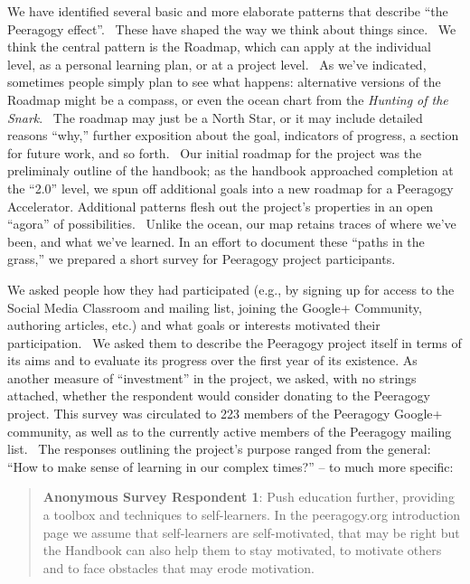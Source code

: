 We have identified several basic and more elaborate patterns that
describe ``the Peeragogy effect''.~ These have shaped the way we think
about things since.~ We think the central pattern is the Roadmap, which
can apply at the individual level, as a personal learning plan, or at a
project level.~ As we've indicated, sometimes people simply plan to see
what happens: alternative versions of the Roadmap might be a compass, or
even the ocean chart from the \emph{Hunting of the Snark}.~ The roadmap
may just be a North Star, or it may include detailed reasons ``why,''
further exposition about the goal, indicators of progress, a section for
future work, and so forth.~ Our initial roadmap for the project was the
preliminaly outline of the handbook; as the handbook approached
completion at the ``2.0'' level, we spun off additional goals into a new
roadmap for a Peeragogy Accelerator. Additional patterns flesh out the
project's properties in an open ``agora'' of possibilities.~ Unlike the
ocean, our map retains traces of where we've been, and what we've
learned. In an effort to document these ``paths in the grass,'' we
prepared a short survey for Peeragogy project participants.

We asked people how they had participated (e.g., by signing up for
access to the Social Media Classroom and mailing list, joining the
Google+ Community, authoring articles, etc.) and what goals or interests
motivated their participation.~ We asked them to describe the Peeragogy
project itself in terms of its aims and to evaluate its progress over
the first year of its existence. As another measure of ``investment'' in
the project, we asked, with no strings attached, whether the respondent
would consider donating to the Peeragogy project. This survey was
circulated to 223 members of the Peeragogy Google+ community, as well as
to the currently active members of the Peeragogy mailing list.~ The
responses outlining the project's purpose ranged from the general: ``How
to make sense of learning in our complex times?'' -- to much more
specific:

\begin{quote}
\textbf{Anonymous Survey Respondent 1}: Push education further,
providing a toolbox and techniques to self-learners. In the
peeragogy.org introduction page we assume that self-learners are
self-motivated, that may be right but the Handbook can also help them to
stay motivated, to motivate others and to face obstacles that may erode
motivation.
\end{quote}


